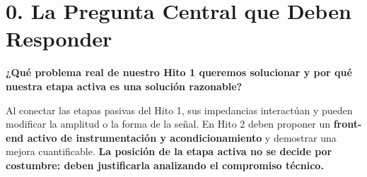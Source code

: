 \documentclass[10pt, a4paper]{article}
\begin{document}
\section*{0. La Pregunta Central que Deben Responder}
\begin{tcolorbox}[colback=white, colframe=black]
    \centering\textbf{¿Qué problema real de nuestro Hito 1 queremos solucionar y por qué nuestra etapa activa es una solución razonable?}
\end{tcolorbox}

Al conectar las etapas pasivas del Hito 1, sus impedancias interactúan y pueden modificar la amplitud o la forma de la señal. En Hito 2 deben proponer un \textbf{front-end activo de instrumentación y acondicionamiento} y demostrar una mejora cuantificable. \textbf{La posición de la etapa activa no se decide por costumbre: deben justificarla analizando el compromiso técnico.}
\end{document}
